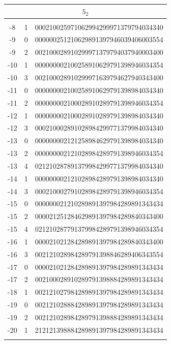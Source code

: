 \documentclass{article}
\begin{document}
\begin{supertabular}[h]{c c r}
\hline 
{}                            \\
\hline \\[-3pt]
-8    & 1  & 000210025971062994299971379794034340  \\
-9    & 0  & 000000251210629891397946039406003554  \\
-9    & 2  & 002100028910299971379794037940003400  \\
-10   & 1  & 000000002100258910629791398946034354  \\
-10   & 3  & 002100028910299971639794627940343400  \\
-11   & 0  & 000000002100258910629791398984034340  \\
-11   & 2  & 000000002100028910289791398946034354  \\
-12   & 1  & 000000002100028910289791398984034340  \\
-12   & 3  & 000210002891028984299771379984034340  \\
-13   & 0  & 000000002121258984629791398984034340  \\
-13   & 2  & 000000002121028984289791398946034354  \\
-13   & 4  & 021210287891379984299771379984034340  \\
-14   & 1  & 000000002121028984289791398984034340  \\
-14   & 3  & 000210002791028984289791398946034354  \\
-15   & 0  & 000000021210289891397984289891343434  \\
-15   & 2  & 000021251284629891397984289840343400  \\
-15   & 4  & 021210287791379984289791398946034354  \\
-16   & 1  & 000021021284289891397984289840343400  \\
-16   & 3  & 002121028984289791398846289406343554  \\
-17   & 0  & 000021021284289891397984289891343434  \\
-17   & 2  & 002100028910289791398884289891343434  \\
-18   & 1  & 002121027984289891397984289891343434  \\
-19   & 0  & 002121028884289891397984289891343434  \\
-19   & 2  & 002121028984289791398884289891343434  \\
-20   & 1  & 212121398884289891397984289891343434  \\
\\[-5pt]


\end{supertabular}
\end{document}
